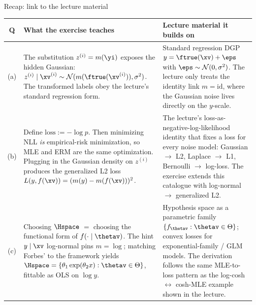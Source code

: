 \documentclass[aspectratio=169]{beamer}
\newcommand{\zi}{z^{(i)}}
\begin{document}
\begin{frame}{Recap: link to the lecture material}
\scriptsize
\renewcommand{\arraystretch}{1.5}
\begin{tabular}{c|p{6.2cm}|p{6.2cm}}
\textbf{Q} & \textbf{What the exercise teaches} & \textbf{Lecture material it builds on} \\
\hline
(a) &
The substitution $\zi = m(\yi)$ exposes the hidden Gaussian:\; $\zi \mid \xv^{(i)} \sim \mathcal{N}(m(\ftrue(\xv^{(i)})), \sigma^2)$. The transformed labels obey the lecture's standard regression form. &
Standard regression DGP $y = \ftrue(\xv) + \eps$ with $\eps \sim \mathcal{N}(0, \sigma^2)$. The lecture only treats the identity link $m = \mathrm{id}$, where the Gaussian noise lives directly on the $y$-scale. \\
(b) &
Define $\text{loss} := -\log p$. Then minimizing NLL \emph{is} empirical-risk minimization, so MLE and ERM are the same optimization. Plugging in the Gaussian density on $\zi$ produces the generalized L2 loss $L(y, f(\xv)) = (m(y) - m(f(\xv)))^2$. &
The lecture's loss-as-negative-log-likelihood identity that fixes a loss for every noise model:\; Gaussian $\to$ L2,\; Laplace $\to$ L1,\; Bernoulli $\to$ log-loss. The exercise extends this catalogue with log-normal $\to$ generalized L2. \\
(c) &
Choosing $\Hspace$ $=$ choosing the functional form of $f(\cdot \mid \thetav)$. The hint $y \mid \xv$ log-normal pins $m = \log$;\; matching Forbes' to the framework yields $\Hspace = \{\theta_1 \exp(\theta_2 x) : \thetav \in \Theta\}$, fittable as OLS on $\log y$. &
Hypothesis space as a parametric family $\{f_{\thetav} : \thetav \in \Theta\}$;\; convex losses for exponential-family / GLM models. The derivation follows the same MLE-to-loss pattern as the log-cosh $\leftrightarrow$ cosh-MLE example shown in the lecture. \\
\end{tabular}
\end{frame}
\end{document}
